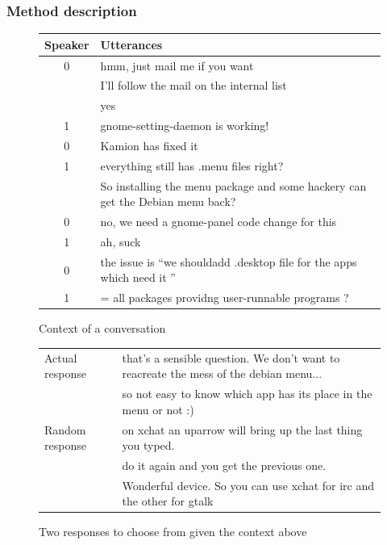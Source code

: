 \documentclass[11pt]{article}
\begin{document}
\subsubsection{Method description}\label{our_methods}


\begin{figure}
\begin{tabular}{| c | l |}
\hline
Speaker & Utterances \\ \hline
0 & hmm, just mail me if you want \\ 
 & I'll follow the mail on the internal list \\ 
 & yes \\ \hline
 1 & gnome-setting-daemon is working! \\ \hline
 0 & Kamion has fixed it \\ \hline
 1 & everything still has .menu files right? \\
 & So installing the menu package and some hackery can get the Debian menu back? \\ \hline
 0 & no, we need a gnome-panel code change for this \\ \hline
 1 & ah, suck \\ \hline
 0 & the issue is ``we shouldadd .desktop file for the apps which need it ''  \\ \hline
 1 & = all packages providng user-runnable programs ? \\ \hline
\end{tabular}
\caption{Context of a conversation}
\label{sample_context}
\vspace{5mm}
\end{figure}

\begin{figure}
\begin{tabular}{| l | l |}
\hline
Actual response & that's a sensible question. We don't want to reacreate the mess of the debian menu... \\
& so not easy to know which app has its place in the menu or not :) \\ \hline
Random response & on xchat an uparrow will bring up the last thing you typed. \\
 & do it again and you get the previous one. \\
 & Wonderful device. So you can use xchat for irc and the other for gtalk \\ \hline
\end{tabular}
\caption{Two responses to choose from given the context above}
\label{sample_response}
\end{figure}
\end{document}
